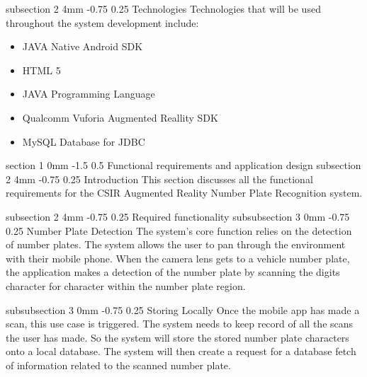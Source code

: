 \documentclass[12pt]{article}
\makeatletter
\renewcommand{\section}{\@startsection
   {section}%
   {1}%
   {0mm}%
   {-1.5\baselineskip}%
   {0.5\baselineskip}%
   {\sffamily\bfseries\upshape\normalsize}}%
\renewcommand{\subsection}{\@startsection
   {subsection}%
   {2}%
   {4mm}%
   {-0.75\baselineskip}%
   {0.25\baselineskip}%
   {\rmfamily\normalfont\scshape\normalsize}}%
\renewcommand{\subsubsection}{\@startsection
   {subsubsection}%
   {3}%
   {0mm}%
   {-0.75\baselineskip}%
   {0.25\baselineskip}%
   {\rmfamily\normalfont\slshape\normalsize}}%
\makeatother
\begin{document}
					\subsection{Technologies}
							Technologies that will be used throughout the system development include:
							\begin{itemize}
								\item JAVA Native Android SDK
								\item HTML 5
								\item JAVA Programming Language
								\item Qualcomm Vuforia Augmented Reallity SDK
								\item MySQL Database for JDBC
							\end{itemize}
                    
                \section{Functional requirements and application design}
                    \subsection{Introduction}
                    This section discusses all the functional requirements for the CSIR Augmented Reality Number Plate Recognition system.
                    
                    \subsection{Required functionality}
                    		\subsubsection{Number Plate Detection}
                    				The system's core function relies on the detection of number plates. The system allows the user to pan through the environment with their mobile phone. When the camera lens gets to a vehicle number plate, the application makes a detection of the number plate by scanning the digits character for character within the number plate region.
                    			
                    			
                    		\subsubsection{Storing Locally}
                    				Once the mobile app has made a scan, this use case is triggered. The system needs to keep record of all the scans the user has made. So the system will store the stored number plate characters onto a local database. The system will then create a request for a database fetch of information related to the scanned number plate.
                    		
\end{document}
